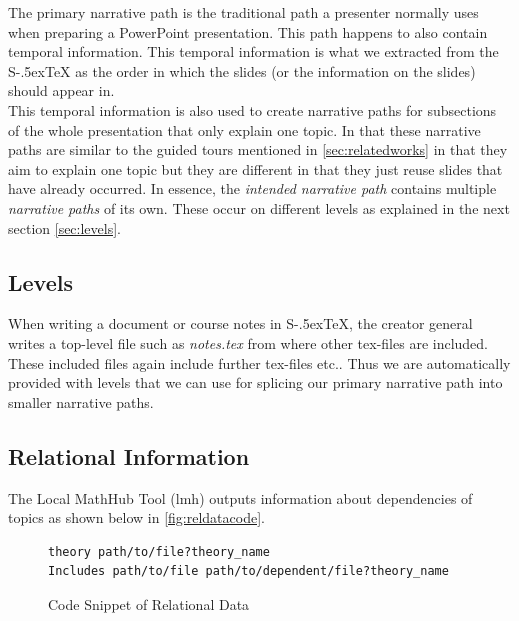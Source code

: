 \documentclass[twoside, 12pt]{article}
\def\stex{\texorpdfstring{\raisebox{-.5ex}S\kern-.5ex\TeX}{sTeX}\xspace}
\begin{document}
The primary narrative path is the traditional path a presenter normally uses when preparing a PowerPoint presentation. This path happens to also contain temporal information. This temporal information is what we extracted from the \stex as the order in which the slides (or the information on the slides) should appear in.\\

This temporal information is also used to create narrative paths for subsections of the whole presentation that only explain one topic. In that these narrative paths are similar to the guided tours mentioned in \autoref{sec:relatedworks} in that they aim to explain one topic but they are different in that they just reuse slides that have already occurred.  In essence, the \textit{intended narrative path} contains multiple \textit{narrative paths} of its own. These occur on different levels as explained in the next section \autoref{sec:levels}.\\

\subsection{Levels}
\label{sec:levels}

When writing a document or course notes in \stex, the creator general writes a top-level file such as \textit{notes.tex} from where other tex-files are included. These included files again include further tex-files etc.. Thus we are automatically provided with levels that we can use for splicing our primary narrative path into smaller narrative paths.\\



\subsection{Relational Information}
\label{sec:relInfo}

The Local MathHub Tool (lmh) outputs information about dependencies of topics as shown below in \autoref{fig:reldatacode}. \\

\begin{figure}
\vspace{-26pt}
\begin{verbatim}
theory path/to/file?theory_name
Includes path/to/file path/to/dependent/file?theory_name
\end{verbatim}
\vspace{-5pt}
  \caption{Code Snippet of Relational Data}
  \label{fig:reldatacode}
  \vspace{12pt}
\end{figure}
\end{document}
